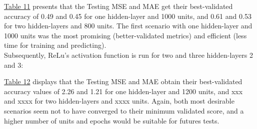 \hyperref[table:Results for LSTM, Tanh, High]{Table 11} presents that the Testing MSE and MAE get their best-validated accuracy of 0.49 and 0.45 for one hidden-layer and 1000 units, and 0.61 and 0.53 for two hidden-layers and 800 units. The first scenario with one hidden-layer and 1000 units was the most promising (better-validated metrics) and efficient (less time for training and predicting).\\

Subsequently, ReLu's activation function is run for two and three hidden-layers 2 and 3:

\begin{table}[H]
\centering
{}
\label{table:Results for LSTM, ReLu, High}
\caption{Parameters' combinations for predicting the next day's highest price.}
\end{table}

\hyperref[table:Results for LSTM, ReLu, High]{Table 12} displays that the Testing MSE and MAE obtain their best-validated accuracy values of 2.26 and 1.21 for one hidden-layer and 1200 units, and xxx and xxxx for two hidden-layers and xxxx units. Again, both most desirable scenarios seem not to have converged to their minimum validated score, and a higher number of units and epochs would be suitable for futures tests.

